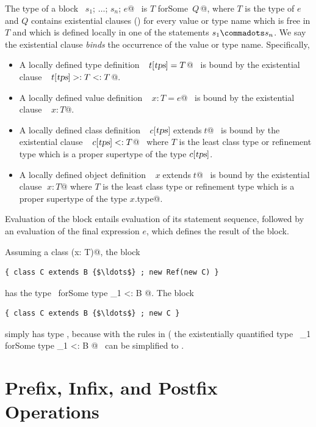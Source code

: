 The type of a block ~\lstinline@$s_1$; $\ldots$; $s_n$; $e$@~ is
\lstinline@$T$ forSome {$\,Q\,$}@, where $T$ is the type of $e$ and $Q$ 
contains existential clauses ()
for every value or type name which is free in $T$ 
and which is defined locally in one of the statements $s_1 \commadots s_n$.
We say the existential clause {\em binds} the occurrence of the value or type name.
Specifically, 
\begin{itemize}
\item
A locally defined type definition  ~\lstinline@type$\;t[\mbox{\sl tps}] = T$@~
is bound by the existential clause ~\lstinline@type$\;t[\mbox{\sl tps}] >: T <: T$@.
\item
A locally defined value definition~ \lstinline@val$\;x: T = e$@~ is
bound by the existential clause ~\lstinline@val$\;x: T$@.
\item
A locally defined class definition ~\lstinline@class$\;c$[$\mbox{\sl tps}$] extends$\;t$@~
is bound by the existential clause ~\lstinline@type$\;c[\mbox{\sl tps}] <: T$@~ where
$T$ is the least class type or refinement type which is a proper
supertype of the type $c[\mbox{\sl tps}]$.
\item
A locally defined object definition ~\lstinline@object$\;x\;$extends$\;t$@~
is bound by the existential clause \lstinline@val$\;x: T$@ where
$T$ is the least class type or refinement type which is a proper supertype of the type 
\lstinline@$x$.type@.
\end{itemize}
Evaluation of the block entails evaluation of its
statement sequence, followed by an evaluation of the final expression
$e$, which defines the result of the block.

\example
Assuming a class \lstinline@Ref[T](x: T)@, the block
\begin{lstlisting}
{ class C extends B {$\ldots$} ; new Ref(new C) }
\end{lstlisting}
has the type ~\lstinline@Ref[_1] forSome { type _1 <: B }@.
The block
\begin{lstlisting}
{ class C extends B {$\ldots$} ; new C }
\end{lstlisting}
simply has type , because with the rules in
( the existentially quantified type 
~\lstinline@_1 forSome { type _1 <: B }@~ can be simplified to .


\section{Prefix, Infix, and Postfix Operations}
\label{sec:infix-operations}


